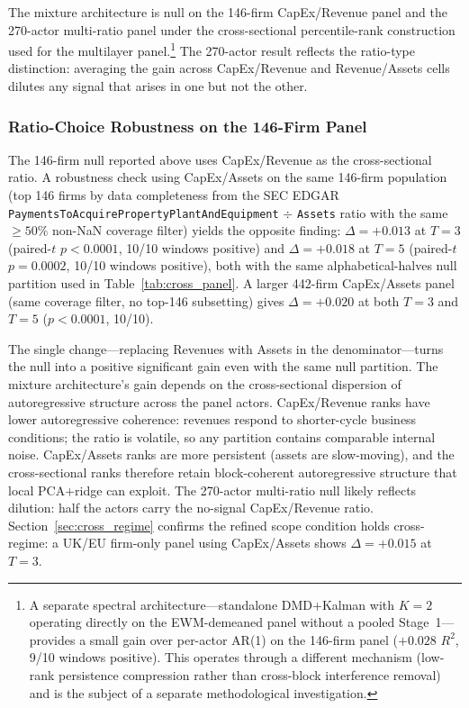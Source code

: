 \documentclass[11pt,a4paper]{article}
\begin{document}
The mixture architecture is null on the 146-firm CapEx/Revenue panel and the 270-actor multi-ratio panel under the cross-sectional percentile-rank construction used for the multilayer panel.\footnote{A separate spectral architecture---standalone DMD+Kalman with $K{=}2$ operating directly on the EWM-demeaned panel without a pooled Stage~1---provides a small gain over per-actor AR(1) on the 146-firm panel ($+0.028$ $R^2$, 9/10 windows positive). This operates through a different mechanism (low-rank persistence compression rather than cross-block interference removal) and is the subject of a separate methodological investigation.} The 270-actor result reflects the ratio-type distinction: averaging the gain across CapEx/Revenue and Revenue/Assets cells dilutes any signal that arises in one but not the other.

\subsubsection*{Ratio-Choice Robustness on the 146-Firm Panel}
\label{sec:ratio_robust}

The 146-firm null reported above uses CapEx/Revenue as the cross-sectional ratio. A robustness check using CapEx/Assets on the same 146-firm population (top 146 firms by data completeness from the SEC EDGAR \texttt{PaymentsToAcquirePropertyPlantAndEquipment} $\div$ \texttt{Assets} ratio with the same $\geq 50\%$ non-NaN coverage filter) yields the opposite finding: $\Delta = +0.013$ at $T=3$ (paired-$t$ $p < 0.0001$, 10/10 windows positive) and $\Delta = +0.018$ at $T=5$ (paired-$t$ $p = 0.0002$, 10/10 windows positive), both with the same alphabetical-halves null partition used in Table~\ref{tab:cross_panel}. A larger 442-firm CapEx/Assets panel (same coverage filter, no top-146 subsetting) gives $\Delta = +0.020$ at both $T=3$ and $T=5$ ($p < 0.0001$, 10/10).

The single change---replacing Revenues with Assets in the denominator---turns the null into a positive significant gain even with the same null partition. The mixture architecture's gain depends on the cross-sectional dispersion of autoregressive structure across the panel actors. CapEx/Revenue ranks have lower autoregressive coherence: revenues respond to shorter-cycle business conditions; the ratio is volatile, so any partition contains comparable internal noise. CapEx/Assets ranks are more persistent (assets are slow-moving), and the cross-sectional ranks therefore retain block-coherent autoregressive structure that local PCA+ridge can exploit. The 270-actor multi-ratio null likely reflects dilution: half the actors carry the no-signal CapEx/Revenue ratio. Section~\ref{sec:cross_regime} confirms the refined scope condition holds cross-regime: a UK/EU firm-only panel using CapEx/Assets shows $\Delta = +0.015$ at $T=3$.
\end{document}

